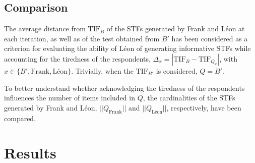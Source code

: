 \documentclass{svproc}
\begin{document}
\subsection{Comparison}

The average distance from $\text{TIF}_B$ of the STFs generated by Frank and Léon at each iteration, as well as of the test obtained from $B'$ has been considered as a criterion for evaluating the ability of Léon of generating informative STFs while accounting for the tiredness of the respondents, $\Delta_x = |\text{TIF}_B - \text{TIF}_{Q_x}|$, with $x \in \{B', \text{Frank}, \text{Léon}\}$.  Trivially, when the $\text{TIF}_{B'}$ is considered, $Q = B'$.

To better understand whether acknowledging the tiredness of the respondents influences the number of items included in $Q$, the cardinalities of the STFs generated by Frank and Léon, $||Q_{\text{Frank}}||$ and $||Q_{\text{Léon}}||$, respectively, have been compared. 

  

\section{Results}

%
\end{document}
